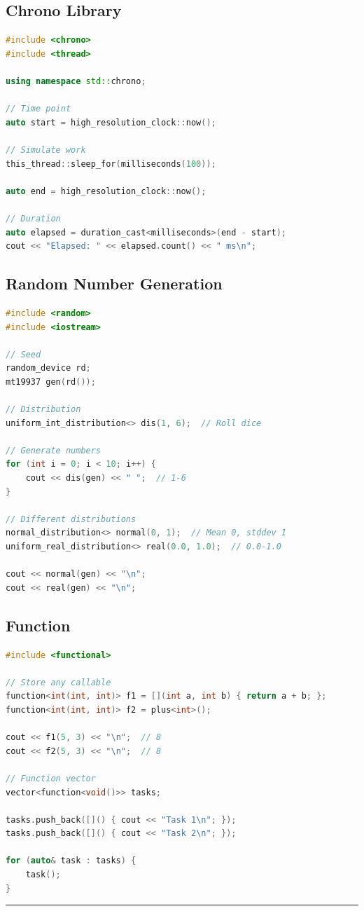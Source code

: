 \hypertarget{chrono-library}{%
\subsection{Chrono Library}\label{chrono-library}}

\begin{lstlisting}[language={C++}]
#include <chrono>
#include <thread>

using namespace std::chrono;

// Time point
auto start = high_resolution_clock::now();

// Simulate work
this_thread::sleep_for(milliseconds(100));

auto end = high_resolution_clock::now();

// Duration
auto elapsed = duration_cast<milliseconds>(end - start);
cout << "Elapsed: " << elapsed.count() << " ms\n";
\end{lstlisting}

\hypertarget{random-number-generation}{%
\subsection{Random Number Generation}\label{random-number-generation}}

\begin{lstlisting}[language={C++}]
#include <random>
#include <iostream>

// Seed
random_device rd;
mt19937 gen(rd());

// Distribution
uniform_int_distribution<> dis(1, 6);  // Roll dice

// Generate numbers
for (int i = 0; i < 10; i++) {
    cout << dis(gen) << " ";  // 1-6
}

// Different distributions
normal_distribution<> normal(0, 1);  // Mean 0, stddev 1
uniform_real_distribution<> real(0.0, 1.0);  // 0.0-1.0

cout << normal(gen) << "\n";
cout << real(gen) << "\n";
\end{lstlisting}

\hypertarget{function}{%
\subsection{Function}\label{function}}

\begin{lstlisting}[language={C++}]
#include <functional>

// Store any callable
function<int(int, int)> f1 = [](int a, int b) { return a + b; };
function<int(int, int)> f2 = plus<int>();

cout << f1(5, 3) << "\n";  // 8
cout << f2(5, 3) << "\n";  // 8

// Function vector
vector<function<void()>> tasks;

tasks.push_back([]() { cout << "Task 1\n"; });
tasks.push_back([]() { cout << "Task 2\n"; });

for (auto& task : tasks) {
    task();
}
\end{lstlisting}

\begin{center}\rule{0.5\linewidth}{0.5pt}\end{center}
